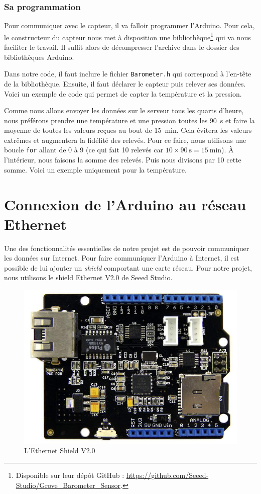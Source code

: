 \subsubsection{Sa programmation}

Pour communiquer avec le capteur, il va falloir programmer l'Arduino. Pour cela, le constructeur du capteur nous met à disposition une bibliothèque\footnote{Disponible sur leur dépôt GitHub : \url{https://github.com/Seeed-Studio/Grove_Barometer_Sensor}.} qui va nous faciliter le travail. Il suffit alors de décompresser l'archive dans le dossier des bibliothèques Arduino.

Dans notre code, il faut inclure le fichier \verb-Barometer.h- qui correspond à l'en-tête de la bibliothèque. Ensuite, il faut déclarer le capteur puis relever ses données. Voici un exemple de code qui permet de capter la température et la pression.


\Espace

Comme nous allons envoyer les données sur le serveur tous les quarts d'heure, nous préférons prendre une température et une pression toutes les \SI{90}{\second} et faire la moyenne de toutes les valeurs reçues au bout de \SI{15}{\minute}. Cela évitera les valeurs extrêmes et augmentera la fidélité des relevés. Pour ce faire, nous utilisons une boucle \verb-for- allant de 0 à 9 (ce qui fait 10 relevés car $10 \times \SI{90}{\second} = \SI{15}{\minute}$). À l'intérieur, nous faisons la somme des relevés. Puis nous divisons par 10 cette somme. Voici un exemple uniquement pour la température.


\section{Connexion de l'Arduino au réseau Ethernet}

Une des fonctionnalités essentielles de notre projet est de pouvoir communiquer les données sur Internet. Pour faire communiquer l'Arduino à Internet, il est possible de lui ajouter un \emph{shield} comportant une carte réseau. Pour notre projet, nous utilisons le shield Ethernet V2.0 de Seeed Studio.

\begin{figure}
	\centering
	\includegraphics[width=.4\linewidth]{Images/Ethernet_Shield_V2-0}
	\caption{L'Ethernet Shield V2.0}
\end{figure}

